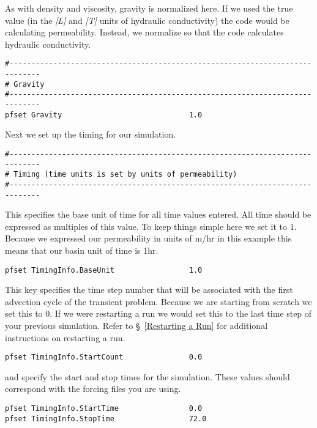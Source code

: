 As with density and viscosity, gravity is normalized here.  If we used the true value
(in the \emph{[L]} and \emph{[T]} units of hydraulic conductivity) the code would be calculating permeability.  
Instead, we normalize so that the code calculates hydraulic conductivity.

\begin{verbatim}
#-----------------------------------------------------------------------------
# Gravity
#-----------------------------------------------------------------------------
pfset Gravity                             1.0
\end{verbatim}

Next we set up the timing for our simulation.

\begin{verbatim}
#-----------------------------------------------------------------------------
# Timing (time units is set by units of permeability)
#-----------------------------------------------------------------------------
\end{verbatim}

This specifies the base unit of time for all time values entered. All time should be expressed
as multiples of this value. To keep things simple here we set it to 1. Because we expressed
our permeability in units of m/hr in this example this means that our basin unit of time is 1hr. 

\begin{verbatim}
pfset TimingInfo.BaseUnit                 1.0
\end{verbatim}

This key specifies the time step number that will be associated with the first advection cycle
of the transient problem. Because we are starting from scratch we set this to 0. If we were 
restarting a run we would set this to the last time step of your previous simulation. Refer to 
\S~\ref{Restarting a Run} for additional instructions on restarting a run.

\begin{verbatim}
pfset TimingInfo.StartCount               0.0
\end{verbatim}

 and  specify the start and stop times for the simulation. These 
values should correspond with the forcing files you are using. 

\begin{verbatim}
pfset TimingInfo.StartTime                0.0
pfset TimingInfo.StopTime                 72.0
\end{verbatim}

